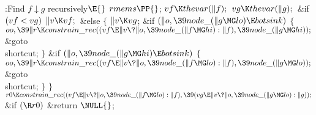 \B{}:Find $f\downarrow g$ recursively\X${}\E{}$\6
$\\{rmems}\PP{}$;\6
${}\\{vf}\K\\{thevar}(\|f);{}$\6
${}\\{vg}\K\\{thevar}(\|g);{}$\6
\&{if} ${}(\\{vf}<\\{vg}){}$\1\5
${}\|v\K\\{vf};{}$\2\6
\&{else}\5
${}\{{}$\1\6
${}\|v\K\\{vg}{}$;\6
\&{if} ${}(\|o,\39\\{node\_}(\|g\MG\\{lo})\E\\{botsink}){}$\5
${}\{{}$\1\6
${}\\{oo},\39\|r\K\\{constrain\_rec}((\\{vf}\E\|v\?\|o,\39\\{node\_}(\|f\MG%
\\{hi}):\|f),\39\\{node\_}(\|g\MG\\{hi}));{}$\6
\&{goto} \\{shortcut};\6
\4${}\}{}$\2\6
\&{if} ${}(\|o,\39\\{node\_}(\|g\MG\\{hi})\E\\{botsink}){}$\5
${}\{{}$\1\6
${}\\{oo},\39\|r\K\\{constrain\_rec}((\\{vf}\E\|v\?\|o,\39\\{node\_}(\|f\MG%
\\{lo}):\|f),\39\\{node\_}(\|g\MG\\{lo}));{}$\6
\&{goto} \\{shortcut};\6
\4${}\}{}$\2\6
\4${}\}{}$\2\6
${}\\{r0}\K\\{constrain\_rec}((\\{vf}\E\|v\?\|o,\39\\{node\_}(\|f\MG\\{lo}):%
\|f),\39(\\{vg}\E\|v\?\|o,\39\\{node\_}(\|g\MG\\{lo}):\|g));{}$\6
\&{if} ${}(\R\\{r0}){}$\1\5
\&{return} ${}\NULL{}$;\2\6
